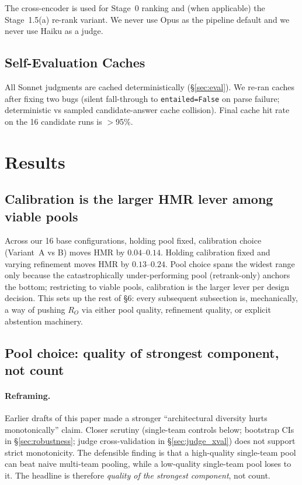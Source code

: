 \documentclass[11pt,a4paper]{article}
\begin{document}
\noindent The cross-encoder is used for Stage~0 ranking and (when
applicable) the Stage~1.5(a) re-rank variant. We never use Opus as
the pipeline default and we never use Haiku as a judge.

\subsection{Self-Evaluation Caches}

All Sonnet judgments are cached deterministically (\S\ref{sec:eval}).
We re-ran caches after fixing two bugs (silent fall-through to
\texttt{entailed=False} on parse failure; deterministic vs sampled
candidate-answer cache collision). Final cache hit rate on the 16
candidate runs is $>$95\%.

\section{Results}

\subsection{Calibration is the larger HMR lever among viable pools}\label{sec:rq1}

Across our 16 base configurations, holding pool fixed, calibration
choice (Variant~A vs B) moves HMR by $0.04$–$0.14$. Holding
calibration fixed and varying refinement moves HMR by $0.13$–$0.24$.
Pool choice spans the widest range only because the catastrophically
under-performing pool (retrank-only) anchors the bottom; restricting
to viable pools, calibration is the larger lever per design decision.
This sets up the rest of §6: every subsequent subsection is, mechanically,
a way of pushing $R_O$ via either pool quality, refinement quality, or
explicit abstention machinery.

\subsection{Pool choice: quality of strongest component, not count}\label{sec:rq2}

\paragraph{Reframing.} Earlier drafts of this paper made a stronger
``architectural diversity hurts monotonically'' claim. Closer scrutiny
(single-team controls below; bootstrap CIs in \S\ref{sec:robustness};
judge cross-validation in \S\ref{sec:judge_xval}) does not support
strict monotonicity. The defensible finding is that a high-quality
single-team pool can beat naive multi-team pooling, while a
low-quality single-team pool loses to it. The headline is therefore
\emph{quality of the strongest component}, not count.
\end{document}
